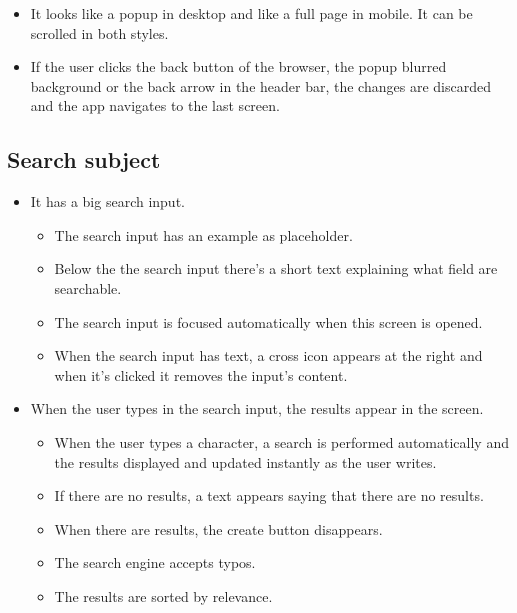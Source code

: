 \begin{itemize}[leftmargin=2cm]
\begin{itemize}[leftmargin=2cm]
    \end{itemize}
    \item[\nextTask{}\label{req:x}] It looks like a popup in desktop and like a full page in mobile. It can be scrolled in both styles.
    \item[\nextTask{}\label{req:x}] If the user clicks the back button of the browser, the popup blurred background or the back arrow in the header bar, the changes are discarded and the app navigates to the last screen.
\end{itemize}

\subsection*{Search subject}
\begin{itemize}[leftmargin=2cm]
    \item[\nextTask{}\label{req:x}] It has a big search input.
    \begin{itemize}[leftmargin=2cm]
        \item[\nextTask{}\label{req:x}] The search input has an example as placeholder.
        \item[\nextTask{}\label{req:x}] Below the the search input there's a short text explaining what field are searchable.
        \item[\nextTask{}\label{req:x}] The search input is focused automatically when this screen is opened.
        \item[\nextTask{}\label{req:x}] When the search input has text, a cross icon appears at the right and when it's clicked it removes the input's content.
    \end{itemize}
    \item[\nextTask{}\label{req:x}] When the user types in the search input, the results appear in the screen.
    \begin{itemize}[leftmargin=2cm]
        \item[\nextTask{}\label{req:x}] When the user types a character, a search is performed automatically and the results displayed and updated instantly as the user writes.
        \item[\nextTask{}\label{req:x}] If there are no results, a text appears saying that there are no results.
        \item[\nextTask{}\label{req:x}] When there are results, the create button disappears.
        \item[\nextTask{}\label{req:x}] The search engine accepts typos.
        \item[\nextTask{}\label{req:x}] The results are sorted by relevance.

\end{itemize}
\end{itemize}
